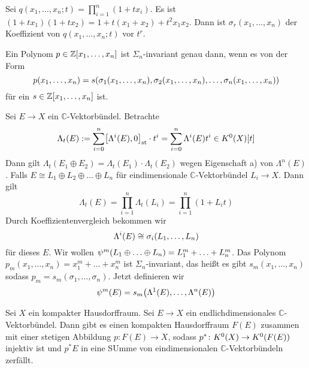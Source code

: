 Sei $q(x_1,\ldots ,x_n;t) = \prod_{i=1}^n (1+ t x_i)$. Es ist $(1+t x_1)(1+ t x_2)= 1+ t(x_1 + x_2) + t^2 x_1 x_2$. Dann ist $\sigma_r(x_1,\ldots ,x_n)$ der Koeffizient
von $q(x_1, \ldots ,x_n;t)$ vor $t^r$.
\begin{satz}
Ein Polynom $p \in \mathds{Z} \benbrace*{x_1,\ldots ,x_n}$ ist $\Sigma_n$-invariant genau dann, wenn es von der Form 
\[
	p(x_1, \ldots ,x_n) = s \enbrace*{ \sigma_1(x_1, \ldots ,x_n), \sigma_2(x_1, \ldots ,x_n) , \ldots ,  \sigma_n(x_1,\ldots ,x_n)} 
\]
für ein $s \in \mathds{Z} \benbrace*{x_1, \ldots ,x_n} $ ist.
\end{satz}

Sei $E \to X$ ein $\mathds{C}$-Vektorbündel. Betrachte 
\[
	\Lambda_t(E) := \sum_{i=0}^{n} \benbrace*{\Lambda^i(E),0}_\st  \cdot t^i = \sum_{i=0}^{n} \Lambda^i(E) t^i \in K^0(X)[t]
\]
Dann gilt $\Lambda_t(E_1 \oplus E_2) = \Lambda_t(E_1) \cdot \Lambda_t(E_2)$ wegen Eigenschaft a) von $\Lambda^n(E)$. Falls $E \cong L_1 \oplus L_2 \oplus \ldots \oplus L_n$ 
für eindimensionale $\mathds{C}$-Vektorbündel $L_i \to X$. Dann gilt
\[
	\Lambda_t(E) = \prod_{i=1}^n \Lambda_t(L_i) = \prod_{i=1}^n (1+ L_i t)
\]
Durch Koeffizientenvergleich bekommen wir 
\[
	\Lambda^i(E) \cong \sigma_i \enbrace*{L_1, \ldots , L_n} 
\]
für dieses $E$. Wir wollen $\psi^m \enbrace*{L_1 \oplus  \ldots  \oplus  L_n} = L_1^m + \ldots + L_n^m $. Das Polynom $p_m(x_1,\ldots,x_n)= x_1^m + \ldots + x_n^m$ ist 
$\Sigma_n$-invariant, das heißt es gibt $s_m(x_1,\ldots ,x_n)$ sodass $p_m= s_m(\sigma_1, \ldots ,\sigma_n)$. Jetzt definieren wir 
\[
	\psi^m(E) = s_m \enbrace*{\Lambda^1(E), \ldots, \Lambda^n(E)} 
\]
\begin{satz}[name=Spaltungsprinzip]
Sei $X$ ein kompakter Hausdorffraum. Sei $E \to X$ ein endlichdimensionales $\mathds{C}$-Vektorbündel. Dann gibt es einen kompakten Hausdorffraum $F(E)$ zusammen mit einer
stetigen Abbildung $p \colon F(E) \to X$, sodass $p^* \colon K^0(X) \to K^0 \enbrace*{F(E)}$ injektiv ist und $p^*E$ in eine SUmme von eindimensionalen 
$\mathds{C}$-Vektorbündeln zerfällt.
\end{satz}

